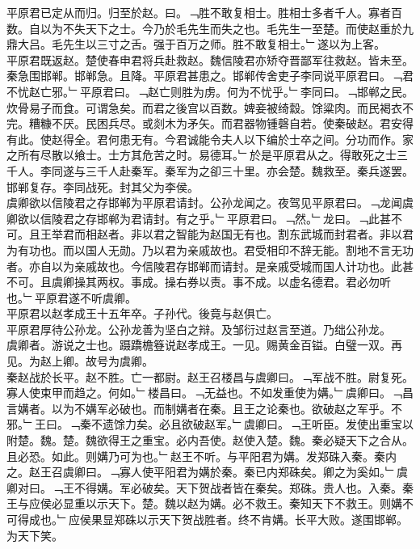 \documentclass{zhvt-classic}
\begin{document}
\hspace*{2em}平原君已定从而归。归至於赵。曰。﹁胜不敢复相士。胜相士多者千人。寡者百数。自以为不失天下之士。今乃於毛先生而失之也。毛先生一至楚。而使赵重於九鼎大吕。毛先生以三寸之舌。强于百万之师。胜不敢复相士。﹂遂以为上客。\\
\hspace*{2em}平原君既返赵。楚使春申君将兵赴救赵。魏信陵君亦矫夺晋鄙军往救赵。皆未至。秦急围邯郸。邯郸急。且降。平原君甚患之。邯郸传舍吏子李同说平原君曰。﹁君不忧赵亡邪。﹂平原君曰。﹁赵亡则胜为虏。何为不忧乎。﹂李同曰。﹁邯郸之民。炊骨易子而食。可谓急矣。而君之後宫以百数。婢妾被绮縠。馀粱肉。而民褐衣不完。糟糠不厌。民困兵尽。或剡木为矛矢。而君器物锺磬自若。使秦破赵。君安得有此。使赵得全。君何患无有。今君诚能令夫人以下编於士卒之间。分功而作。家之所有尽散以飨士。士方其危苦之时。易德耳。﹂於是平原君从之。得敢死之士三千人。李同遂与三千人赴秦军。秦军为之卻三十里。亦会楚。魏救至。秦兵遂罢。邯郸复存。李同战死。封其父为李侯。\\
\hspace*{2em}虞卿欲以信陵君之存邯郸为平原君请封。公孙龙闻之。夜驾见平原君曰。﹁龙闻虞卿欲以信陵君之存邯郸为君请封。有之乎。﹂平原君曰。﹁然。﹂龙曰。﹁此甚不可。且王举君而相赵者。非以君之智能为赵国无有也。割东武城而封君者。非以君为有功也。而以国人无勋。乃以君为亲戚故也。君受相印不辞无能。割地不言无功者。亦自以为亲戚故也。今信陵君存邯郸而请封。是亲戚受城而国人计功也。此甚不可。且虞卿操其两权。事成。操右券以责。事不成。以虚名德君。君必勿听也。﹂平原君遂不听虞卿。\\
\hspace*{2em}平原君以赵孝成王十五年卒。子孙代。後竟与赵俱亡。\\
\hspace*{2em}平原君厚待公孙龙。公孙龙善为坚白之辩。及邹衍过赵言至道。乃绌公孙龙。\\
\hspace*{2em}虞卿者。游说之士也。蹑蹻檐簦说赵孝成王。一见。赐黄金百镒。白璧一双。再见。为赵上卿。故号为虞卿。\\
\hspace*{2em}秦赵战於长平。赵不胜。亡一都尉。赵王召楼昌与虞卿曰。﹁军战不胜。尉复死。寡人使束甲而趋之。何如。﹂楼昌曰。﹁无益也。不如发重使为媾。﹂虞卿曰。﹁昌言媾者。以为不媾军必破也。而制媾者在秦。且王之论秦也。欲破赵之军乎。不邪。﹂王曰。﹁秦不遗馀力矣。必且欲破赵军。﹂虞卿曰。﹁王听臣。发使出重宝以附楚。魏。楚。魏欲得王之重宝。必内吾使。赵使入楚。魏。秦必疑天下之合从。且必恐。如此。则媾乃可为也。﹂赵王不听。与平阳君为媾。发郑硃入秦。秦内之。赵王召虞卿曰。﹁寡人使平阳君为媾於秦。秦已内郑硃矣。卿之为奚如。﹂虞卿对曰。﹁王不得媾。军必破矣。天下贺战者皆在秦矣。郑硃。贵人也。入秦。秦王与应侯必显重以示天下。楚。魏以赵为媾。必不救王。秦知天下不救王。则媾不可得成也。﹂应侯果显郑硃以示天下贺战胜者。终不肯媾。长平大败。遂围邯郸。为天下笑。\\
\end{document}
